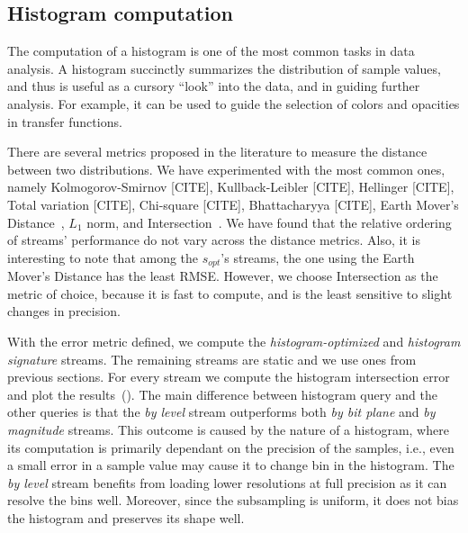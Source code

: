 \subsection{Histogram computation}\label{sec:histogram}


The computation of a histogram is one of the most common tasks in data analysis. A histogram
succinctly summarizes the distribution of sample values, and thus is useful as a cursory ``look''
into the data, and in guiding further analysis. For example, it can be used to guide the selection
of colors and opacities in transfer functions.

There are several metrics proposed in the literature to measure the distance between two
distributions. We have experimented with the most common ones, namely Kolmogorov-Smirnov [CITE],
Kullback-Leibler [CITE], Hellinger [CITE], Total variation [CITE], Chi-square [CITE], Bhattacharyya
[CITE], Earth Mover's Distance~\cite{emd1998}, $L_1$ norm, and
Intersection~\cite{histogram_intersection1991}. We have found that the relative ordering of streams'
performance do not vary across the distance metrics. Also, it is interesting to note that among the
$s_{opt}$'s streams, the one using the Earth Mover's Distance has the least RMSE. However, we choose
Intersection as the metric of choice, because it is fast to compute, and is the least sensitive to
slight changes in precision.

With the error metric defined, we compute the {\em histogram-optimized} and {\em histogram
signature} streams. The remaining streams are static and we use ones from previous sections. For
every stream we compute the histogram intersection error and plot the
results~(). The main difference between histogram query and
the other queries is that the {\em by level} stream outperforms both {\em by bit plane} and {\em by
magnitude} streams. This outcome is caused by the nature of a histogram, where its computation is
primarily dependant on the precision of the samples, i.e., even a small error in a sample value may
cause it to change bin in the histogram. The {\em by level} stream benefits from loading lower
resolutions at full precision as it can resolve the bins well. Moreover, since the subsampling is
uniform, it does not bias the histogram and preserves its shape well.


